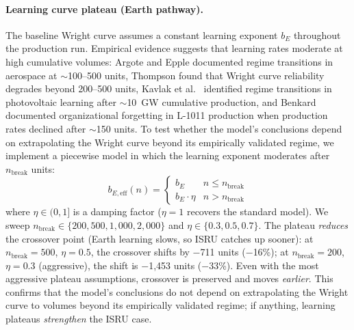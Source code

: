 \documentclass[preprint,12pt]{elsarticle}
\begin{document}
\paragraph{Learning curve plateau (Earth pathway).} The baseline Wright curve assumes a constant learning exponent $b_E$ throughout the production run. Empirical evidence suggests that learning rates moderate at high cumulative volumes: Argote and Epple \cite{argote1990} documented regime transitions in aerospace at $\sim$100--500 units, Thompson \cite{thompson2012} found that Wright curve reliability degrades beyond 200--500 units, Kavlak et al.\ \cite{kavlak2018} identified regime transitions in photovoltaic learning after $\sim$10~GW cumulative production, and Benkard \cite{benkard2000} documented organizational forgetting in L-1011 production when production rates declined after $\sim$150 units. To test whether the model's conclusions depend on extrapolating the Wright curve beyond its empirically validated regime, we implement a piecewise model in which the learning exponent moderates after $n_{\mathrm{break}}$ units:
\begin{equation}
  b_{E,\mathrm{eff}}(n) = \begin{cases} b_E & n \leq n_{\mathrm{break}} \\ b_E \cdot \eta & n > n_{\mathrm{break}} \end{cases}
\end{equation}
where $\eta \in (0, 1]$ is a damping factor ($\eta = 1$ recovers the standard model). We sweep $n_{\mathrm{break}} \in \{200, 500, 1{,}000, 2{,}000\}$ and $\eta \in \{0.3, 0.5, 0.7\}$. The plateau \emph{reduces} the crossover point (Earth learning slows, so ISRU catches up sooner): at $n_{\mathrm{break}} = 500$, $\eta = 0.5$, the crossover shifts by $-$711 units ($-$16\%); at $n_{\mathrm{break}} = 200$, $\eta = 0.3$ (aggressive), the shift is $-$1{,}453 units ($-$33\%). Even with the most aggressive plateau assumptions, crossover is preserved and moves \emph{earlier}. This confirms that the model's conclusions do not depend on extrapolating the Wright curve to volumes beyond its empirically validated regime; if anything, learning plateaus \emph{strengthen} the ISRU case.
\end{document}

